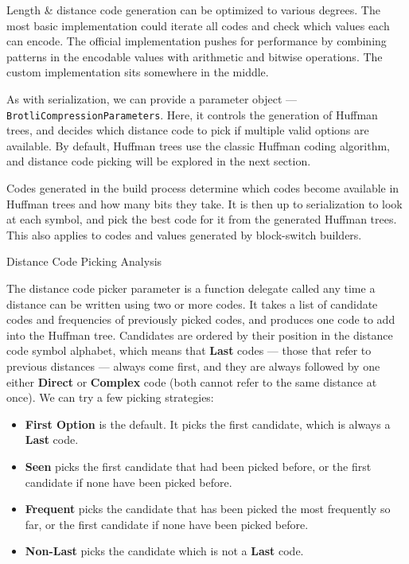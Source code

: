 \documentclass[english,master,dept460,male,cpp,cpdeclaration]{diploma}
\makeatletter
\renewcommand\paragraph
	{\@startsection{paragraph}{4}{\z@}
	{-3.25ex plus 1ex minus .2ex}
	{1.5ex plus .2ex}
	{\normalfont\normalsize\bfseries}}
\newcommand{\subfoursection}[1]{\paragraph{#1}}
\newcommand{\nosep}{\itemsep0em}
\makeatother
\begin{document}
		\noindent
		Length \& distance code generation can be optimized to various degrees. The most basic implementation could iterate all codes and check which values each can encode. The official implementation pushes for performance by combining patterns in the encodable values with arithmetic and bitwise operations. The custom implementation sits somewhere in the middle.
		
		As with serialization, we can provide a parameter object --- \verb|BrotliCompressionParameters|. Here, it controls the generation of Huffman trees, and decides which distance code to pick if multiple valid options are available. By default, Huffman trees use the classic Huffman coding algorithm, and distance code picking will be explored in the next section.
		
		Codes generated in the build process determine which codes become available in Huffman trees and how many bits they take. It is then up to serialization to look at each symbol, and pick the best code for it from the generated Huffman trees. This also applies to codes and values generated by block-switch builders.
		
			\subfoursection{Distance Code Picking Analysis}
			
			The distance code picker parameter is a function delegate called any time a distance can be written using two or more codes. It takes a list of candidate codes and frequencies of previously picked codes, and produces one code to add into the Huffman tree. Candidates are ordered by their position in the distance code symbol alphabet, which means that \textbf{Last} codes --- those that refer to previous distances --- always come first, and they are always followed by one either \textbf{Direct} or \textbf{Complex} code (both cannot refer to the same distance at once). We can try a few picking strategies:
			
			\begin{itemize} \nosep
				\item \textbf{First Option} is the default. It picks the first candidate, which is always a \textbf{Last} code.
				\item \textbf{Seen} picks the first candidate that had been picked before, or the first candidate if none have been picked before.
				\item \textbf{Frequent} picks the candidate that has been picked the most frequently so far, or the first candidate if none have been picked before.
				\item \textbf{Non-Last} picks the candidate which is not a \textbf{Last} code.
			\end{itemize}
			
\end{document}
